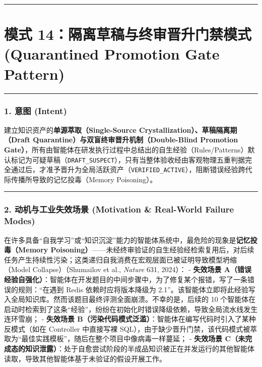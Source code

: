 \begin{center}\rule{0.5\linewidth}{0.5pt}\end{center}

\section{模式 14：隔离草稿与终审晋升门禁模式 (Quarantined Promotion Gate
Pattern)}\label{ux6a21ux5f0f-14ux9694ux79bbux8349ux7a3fux4e0eux7ec8ux5ba1ux664bux5347ux95e8ux7981ux6a21ux5f0f-quarantined-promotion-gate-pattern}

\begin{center}\rule{0.5\linewidth}{0.5pt}\end{center}

\subsubsection{1. 意图 (Intent)}\label{ux610fux56fe-intent-13}

建立知识资产的\textbf{单源萃取（Single-Source
Crystallization）、草稿隔离期（Draft
Quarantine）与双盲终审晋升机制（Double-Blind Promotion
Gate）}，所有由智能体在研发执行过程中总结出的自生经验（Rules/Patterns）默认标记为可疑草稿（\texttt{DRAFT\_SUSPECT}），只有当整体验收经由客观物理五重判据完全通过后，才准予晋升为全局活跃资产（\texttt{VERIFIED\_ACTIVE}），阻断错误经验跨代际传播所导致的记忆投毒（Memory
Poisoning）。

\begin{center}\rule{0.5\linewidth}{0.5pt}\end{center}

\subsubsection{2. 动机与工业失效场景 (Motivation \& Real-World Failure
Modes)}\label{ux52a8ux673aux4e0eux5de5ux4e1aux5931ux6548ux573aux666f-motivation-real-world-failure-modes-13}

在许多具备``自我学习''或``知识沉淀''能力的智能体系统中，最危险的现象是\textbf{记忆投毒（Memory
Poisoning）}------未经终审验证的自生经验经检索复用后，对后续任务产生持续性污染；这类递归自我消费在宏观层面已被证明导致模型坍缩（Model
Collapse）（Shumailov et al., \emph{Nature} 631, 2024）： -
\textbf{失效场景
A（错误经验自强化）}：智能体在开发题目的中间步骤中，为了修复某个报错，写了一条错误的规则：``在遇到
Redis 依赖时应将版本降级为
2.1''。该智能体立即将此经验写入全局知识库。然而该题目最终评测全面崩溃。不幸的是，后续的
10
个智能体在启动时检索到了这条``经验''，纷纷在初始化时错误降级依赖，导致全局流水线发生连环雪崩；
- \textbf{失效场景
B（污染代码模式泛滥）}：智能体在编写代码时引入了某种反模式（如在
Controller 中直接写裸
SQL），由于缺少晋升门禁，该代码模式被萃取为``最佳实践模板''，随后在整个项目中像病毒一样蔓延；
- \textbf{失效场景
C（未完成态的知识泄露）}：处于自愈尝试阶段的半成品知识被正在并发运行的其他智能体读取，导致其他智能体基于未验证的假设开展工作。

